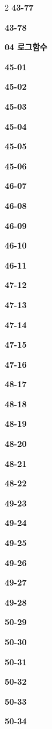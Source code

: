 \documentclass[10pt,a4paper]{article}
\begin{document}
\begin{multicols}{2}
\noindent\textbf{43-77}\ \par
\noindent\textbf{43-78}\ \par
\noindent\textbf{04 로그함수}\par\smallskip
\noindent\textbf{45-01}\ \par
\noindent\textbf{45-02}\ \par
\noindent\textbf{45-03}\ \par
\noindent\textbf{45-04}\ \par
\noindent\textbf{45-05}\ \par
\noindent\textbf{45-06}\ \par
\noindent\textbf{46-07}\ \par
\noindent\textbf{46-08}\ \par
\noindent\textbf{46-09}\ \par
\noindent\textbf{46-10}\ \par
\noindent\textbf{46-11}\ \par
\noindent\textbf{47-12}\ \par
\noindent\textbf{47-13}\ \par
\noindent\textbf{47-14}\ \par
\noindent\textbf{47-15}\ \par
\noindent\textbf{47-16}\ \par
\noindent\textbf{48-17}\ \par
\noindent\textbf{48-18}\ \par
\noindent\textbf{48-19}\ \par
\noindent\textbf{48-20}\ \par
\noindent\textbf{48-21}\ \par
\noindent\textbf{48-22}\ \par
\noindent\textbf{49-23}\ \par
\noindent\textbf{49-24}\ \par
\noindent\textbf{49-25}\ \par
\noindent\textbf{49-26}\ \par
\noindent\textbf{49-27}\ \par
\noindent\textbf{49-28}\ \par
\noindent\textbf{50-29}\ \par
\noindent\textbf{50-30}\ \par
\noindent\textbf{50-31}\ \par
\noindent\textbf{50-32}\ \par
\noindent\textbf{50-33}\ \par
\noindent\textbf{50-34}\ \par

\end{multicols}
\end{document}
